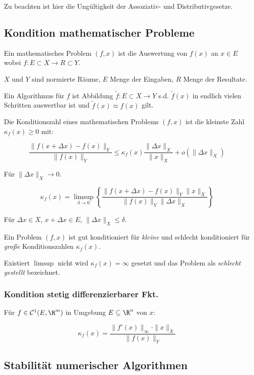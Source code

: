 Zu beachten ist hier die Ungültigkeit der Assoziativ- und Distributivgesetze.

\subsection*{Kondition mathematischer Probleme}

Ein mathematisches Problem $(f,x)$ ist die Auswertung von $f(x)$ an $x \in E$ wobei $f : E \subset X \to R \subset Y$.

$X$ und $Y$ sind normierte Räume, $E$ Menge der Eingaben, $R$ Menge der Resultate.

Ein Algorithmus für $f$ ist Abbildung $\tilde f : E \subset X \to Y$ s.d. $\tilde f(x)$ in endlich vielen Schritten auswertbar ist und $\tilde f(x) \approx f(x)$ gilt.

Die Konditionszahl eines mathematischen Problems $(f, x)$ ist die kleinste Zahl $\kappa_f(x) \geq 0$ mit:

\vspace*{-4mm}
$$\frac{\|f(x + \Delta x) - f(x) \|_Y}{\|f(x)\|_Y} \leq \kappa_f(x) \frac{\|\Delta x\|_X}{\|x\|_X} + o(\|\Delta x \|_X)$$

Für $\|\Delta x\|_X \rightarrow 0$.

\vspace*{-4mm}
$$\kappa_f(x) = \limsup_{\delta \to 0} \left\{ \frac{\|f(x+\Delta x) - f(x)\|_Y \|x\|_X}{\|f(x)\|_Y \|\Delta x\|_X} \right\}$$

Für $\Delta x \in X$, $x + \Delta x \in E$, $\|\Delta x\|_X \leq \delta$.

Ein Problem $(f, x)$ ist gut konditioniert für \emph{kleine} und schlecht konditioniert für \emph{große} Konditionszahlen $\kappa_f(x)$.

Existiert $\limsup$ nicht wird $\kappa_f(x)=\infty$ gesetzt und das Problem als \emph{schlecht gestellt} bezeichnet.


\subsubsection*{Kondition stetig differenzierbarer Fkt.}

Für $f \in \mathcal{C}^1(E, \R^m)$ in Umgebung $E \subseteq \R^n$ von $x$:

\vspace*{-2mm}
$$\kappa_f(x) = \frac{\|f'(x)\|_\infty \cdot \|x\|_X}{\|f(x)\|_Y}$$

\subsection*{Stabilität numerischer Algorithmen}

